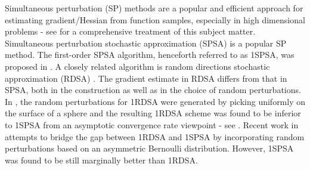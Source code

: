 \documentclass[letterpaper, 10 pt, conference]{ieeeconf}  %
\begin{document}
Simultaneous perturbation (SP) methods are a popular and efficient approach for estimating gradient/Hessian from function samples, especially in high dimensional problems - see \cite{bhatnagar-book} for a comprehensive treatment of this subject matter. 
Simultaneous perturbation stochastic approximation (SPSA) is a popular SP method. The first-order SPSA algorithm, henceforth referred to as 1SPSA, was proposed in \cite{spall}.  A closely related algorithm is random directions stochastic approximation (RDSA) \cite[pp.~58-60]{kushcla}. The gradient estimate in RDSA differs from that in SPSA, both in the construction as well as in the choice of random perturbations.  In \cite{kushcla}, the random perturbations for 1RDSA were generated by picking uniformly on the surface of a sphere and the resulting 1RDSA scheme was found to be  inferior to 1SPSA from an asymptotic convergence rate viewpoint - see \cite{chin1997comparative}.  Recent work in \cite{prashanth2015rdsa} attempts to bridge the gap between 1RDSA and 1SPSA by incorporating random perturbations based on an asymmetric Bernoulli distribution. However,  1SPSA was found to be still marginally better than 1RDSA.  
\end{document}
